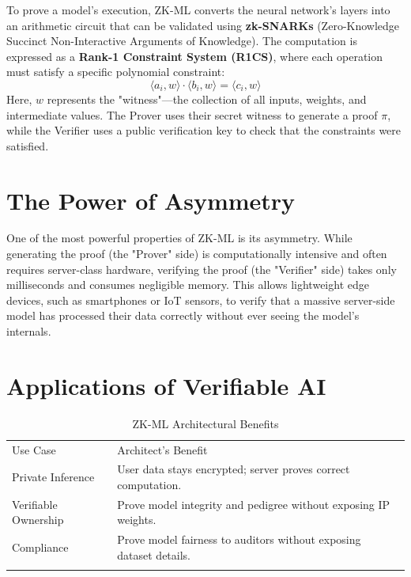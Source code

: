 To prove a model's execution, ZK-ML converts the neural network's layers into an arithmetic circuit that can be validated using \textbf{zk-SNARKs} (Zero-Knowledge Succinct Non-Interactive Arguments of Knowledge). The computation is expressed as a \textbf{Rank-1 Constraint System (R1CS)}, where each operation must satisfy a specific polynomial constraint:
\begin{equation}
\langle a_i, w \rangle \cdot \langle b_i, w \rangle = \langle c_i, w \rangle
\end{equation}
Here, $w$ represents the "witness"---the collection of all inputs, weights, and intermediate values. The Prover uses their secret witness to generate a proof $\pi$, while the Verifier uses a public verification key to check that the constraints were satisfied.

\section{The Power of Asymmetry}
\label{sec:asymmetry_ch19}

One of the most powerful properties of ZK-ML is its asymmetry. While generating the proof (the "Prover" side) is computationally intensive and often requires server-class hardware, verifying the proof (the "Verifier" side) takes only milliseconds and consumes negligible memory. This allows lightweight edge devices, such as smartphones or IoT sensors, to verify that a massive server-side model has processed their data correctly without ever seeing the model's internals.

\section{Applications of Verifiable AI}
\label{sec:zkml_applications_ch19}

\begin{table}
\caption{ZK-ML Architectural Benefits}
\label{tab:zkml_benefits_ch19}
\begin{tabular}{p{3.5cm}p{7cm}}
\hline\noalign{\smallskip}
Use Case & Architect's Benefit \\
\noalign{\smallskip}\svhline\noalign{\smallskip}
Private Inference & User data stays encrypted; server proves correct computation. \\
Verifiable Ownership & Prove model integrity and pedigree without exposing IP weights. \\
Compliance & Prove model fairness to auditors without exposing dataset details. \\
\noalign{\smallskip}\hline\noalign{\smallskip}
\end{tabular}
\end{table}

